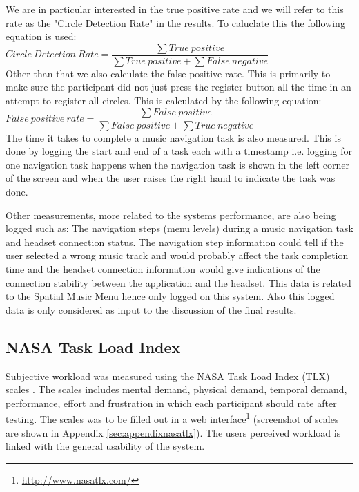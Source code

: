We are in particular interested in the true positive rate and we will refer to this rate as the "Circle Detection Rate" in the results. To caluclate this the following equation is used:\\

$Circle \: Detection \: Rate = \dfrac{\sum{}True \: positive}{\sum{}True \: positive + \sum{}False \: negative}$\\

Other than that we also calculate the false positive rate. This is primarily to make sure the participant did not just press the register button all the time in an attempt to register all circles. This is calculated by the following equation:\\

$False \: positive \: rate = \dfrac{\sum{}False \: positive}{\sum{}False \: positive + \sum{}True \: negative}$\\

The time it takes to complete a music navigation task is also measured. This is done by logging the start and end of a task each with a timestamp i.e. logging for one navigation task happens when the navigation task is shown in the left corner of the screen and when the user raises the right hand to indicate the task was done.

Other measurements, more related to the systems performance, are also being logged such as: The navigation steps (menu levels) during a music navigation task and headset connection status. The navigation step information could tell if the user selected a wrong music track and would probably affect the task completion time and the headset connection information would give indications of the connection stability between the application and the headset. This data is related to the Spatial Music Menu hence only logged on this system. Also this logged data is only considered as input to the discussion of the final results.

\subsection{NASA Task Load Index}
\label{sec:evaluationnasatlx}
Subjective workload was measured using the NASA Task Load Index (TLX) scales \cite{hart_workload_1990}. The scales includes mental demand, physical demand, temporal demand, performance, effort and frustration in which each participant should rate after testing. The scales was to be filled out in a web interface\footnote{\url{http://www.nasatlx.com/}} (screenshot of scales are shown in Appendix \ref{sec:appendixnasatlx}). The users perceived workload is linked with the general usability of the system.


